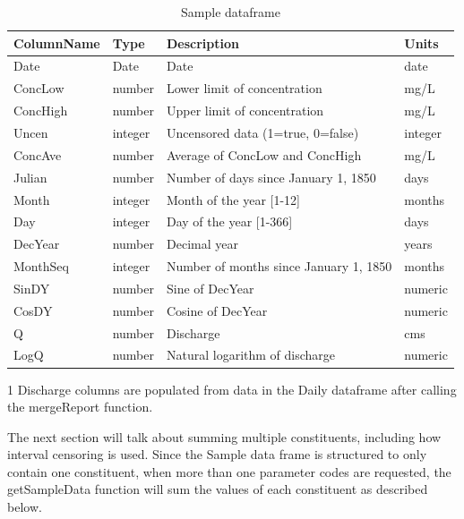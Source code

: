 \documentclass[a4paper,11pt]{article}\usepackage[]{graphicx}\usepackage[]{color}
\begin{document}
\begin{table}
  \centering
  \begin{threeparttable}[b]
  \caption{Sample dataframe}
  \label{tab:SampleDataframe}
  \begin{tabular}{llll}
  \hline
ColumnName & Type & Description & Units \\ 
  \hline
Date & Date & Date & date \\ 
  ConcLow & number & Lower limit of concentration & mg/L \\ 
  ConcHigh & number & Upper limit of concentration & mg/L \\ 
  Uncen & integer & Uncensored data (1=true, 0=false) & integer \\ 
  ConcAve & number & Average of ConcLow and ConcHigh & mg/L \\ 
  Julian & number & Number of days since January 1, 1850 & days \\ 
  Month & integer & Month of the year [1-12] & months \\ 
  Day & integer & Day of the year [1-366] & days \\ 
  DecYear & number & Decimal year & years \\ 
  MonthSeq & integer & Number of months since January 1, 1850 & months \\ 
  SinDY & number & Sine of DecYear & numeric \\ 
  CosDY & number & Cosine of DecYear & numeric \\ 
  Q \tnote{1} & number & Discharge & cms \\ 
  LogQ \tnote{1} & number & Natural logarithm of discharge & numeric \\ 
   \hline
\end{tabular}

  \begin{tablenotes}
    \item[1] Discharge columns are populated from data in the Daily dataframe after calling the mergeReport function.
  \end{tablenotes}
 \end{threeparttable}
\end{table}

The next section will talk about summing multiple constituents, including how interval censoring is used. Since the Sample data frame is structured to only contain one constituent, when more than one parameter codes are requested, the getSampleData function will sum the values of each constituent as described below.
\end{document}
